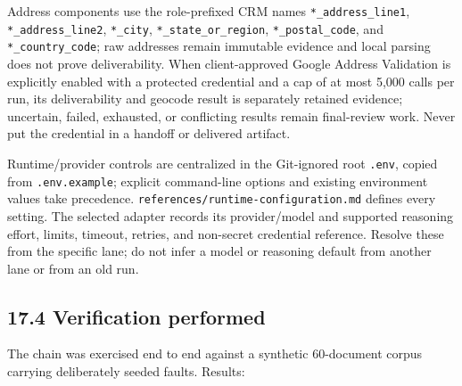 \documentclass[
]{article}
\begin{document}
Address components use the role-prefixed CRM names
\texttt{*\_\allowbreak{}address\_\allowbreak{}line1},
\texttt{*\_\allowbreak{}address\_\allowbreak{}line2},
\texttt{*\_\allowbreak{}city},
\texttt{*\_\allowbreak{}state\_\allowbreak{}or\_\allowbreak{}region},
\texttt{*\_\allowbreak{}postal\_\allowbreak{}code}, and
\texttt{*\_\allowbreak{}country\_\allowbreak{}code}; raw addresses
remain immutable evidence and local parsing does not prove
deliverability. When client-approved Google Address Validation is
explicitly enabled with a protected credential and a cap of at most
5,000 calls per run, its deliverability and geocode result is separately
retained evidence; uncertain, failed, exhausted, or conflicting results
remain final-review work. Never put the credential in a handoff or
delivered artifact.

Runtime/provider controls are centralized in the Git-ignored root
\texttt{.env}, copied from \texttt{.env.example}; explicit command-line
options and existing environment values take precedence.
\texttt{references/\allowbreak{}runtime-\allowbreak{}configuration.md}
defines every setting. The selected adapter records its provider/model
and supported reasoning effort, limits, timeout, retries, and non-secret
credential reference. Resolve these from the specific lane; do not infer
a model or reasoning default from another lane or from an old run.

\subsection{17.4 Verification performed}\label{verification-performed}

The chain was exercised end to end against a synthetic 60-document
corpus carrying deliberately seeded faults. Results:
\end{document}
